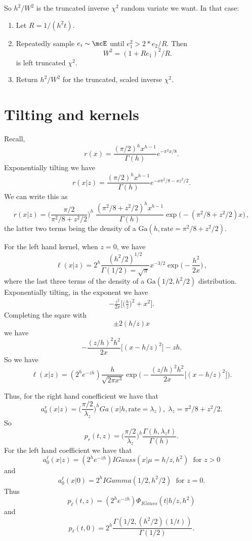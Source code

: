 \documentclass[12pt]{article}
\begin{document}
So $h^2 / W^2$ is the truncated inverse $\chi^2$ random variate we want.  In
that case:
\begin{enumerate}

\item Let $R = 1/(h^2 t)$.  

\item Repeatedly sample $e_i \sim \mcE$ until $e_1^2 > 2 * e_2 / R$.  Then
  \[
  W^2 = (1+R e_1)^2 / R.
  \]
  is left truncated $\chi^2$.

\item Return $h^2 / W^2$ for the truncated, scaled inverse $\chi^2$.
\end{enumerate}

\section{Tilting and kernels}

Recall,
\[
r(x) = \frac{(\pi/2)^h x^{h-1}}{\Gamma(h)} e^{-\pi^2 x / 8}.
\]
Exponentially tilting we have
\[
r(x|z) = \frac{(\pi/2)^h x^{h-1}}{\Gamma(h)} e^{- x\pi^2 / 8 - x z^2 / 2}.
\]
We can write this as
\[
r(x|z) = \Big(\frac{\pi/2}{\pi^2/8 + z^2 / 2}\Big)^{h} \; \frac{(\pi^2/8 + z^2 / 2)^h
  x^{h-1}}{\Gamma(h)} \exp \Big( - (\pi^2/8 + z^2 / 2) x \Big) \, ,
\]
the latter two terms being the density of a $\mbox{Ga}(h,
\mbox{rate}=\pi^2/8+z^2/2)$.

For the left hand kernel, when $z=0$, we have
\[
\ell(x|z) = 2^h \frac{(h^2/2)^{1/2}}{\Gamma(1/2)=\sqrt{\pi}} x^{-3/2} \exp
\Big( - \frac{h^2}{2x} \Big) \, ,
\]
where the last three terms of the density of a $\mbox{Ga}(1/2, h^2/2)$
distribution.  Exponentially tilting, in the exponent we have
\begin{align*}
-\frac{z^2}{2x} \Big[ \big( \frac{h}{z} \big)^2 + x^2 \Big] .
\end{align*}
Completing the sqare with 
\[
\pm 2 (h / z) x
\]
we have
\[
- \frac{(z/h)^2 h^2}{2x} \Big[ (x - h / z)^2 \Big] - z h.
\]
So we have
\[
\ell(x|z) = (2^h e^{-z h} ) \frac{h}{\sqrt{2 \pi x^3}} \exp \Big( -
\frac{(z/h)^2 h^2}{2x} \Big[ (x - h / z)^2 \Big] \Big).
\]

Thus, for the right hand conefficient we have that
\[
a_0^r(x|z) = \Big( \frac{\pi/2}{\lambda_z} \Big)^h Ga(x | h, \mbox{rate}=\lambda_z), \;
\lambda_z = \pi^2/8 + z^2/2.
\]
So
\[
p_r(t,z) = \Big(\frac{\pi/2}{\lambda_z}\Big)^{h} \frac{\Gamma(h, \lambda_z t)}{\Gamma(h)}.
\]
For the left hand coefficient we have that
\[
a_0^\ell(x|z) = (2^h e^{-zh}) IGauss(x|\mu = h/z, h^2) \; \text{ for } z > 0
\]
and
\[
a_0^\ell(x|0) = 2^h IGamma(1/2, h^2/2) \; \text{ for } z = 0.
\]
Thus
\[
p_\ell(t,z) = (2^h e^{-zh}) \Phi_{IGauss}(t | h/z, h^2)
\]
and
\[
p_\ell(t,0) = 2^h \frac{\Gamma(1/2, (h^2/2) (1/t))}{\Gamma(1/2)}.
\]
\end{document}
